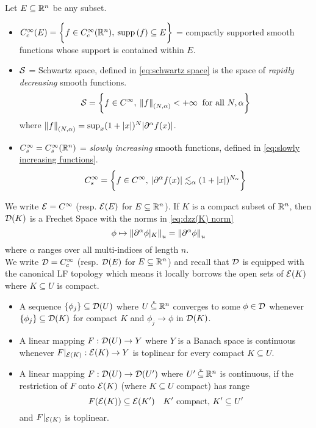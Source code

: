 \documentclass[../main-v2-manifolds.tex]{subfiles}
\begin{document}
Let $E\subseteq {\mathbb{R}^n}$ be any subset.
\begin{itemize}
    \item $C^\infty_c(E)=\biggl\{{f\in C_c^\infty({\mathbb{R}^n}),\: \operatorname{supp}{(f)}\subseteq E}\biggr\}$ = compactly supported smooth functions whose support is contained within $E$.
\end{itemize}
\begin{itemize}
    \item $\mathcal{S}$ = Schwartz space, defined in \cref{eq:schwartz space} is the space of \emph{rapidly decreasing} smooth functions.
        \begin{equation}
        \mathcal{S}=\biggl\{{f\in C^\infty,\: \norm{f}_{(N,\alpha)} <+\infty\:\text{ for all }N,\alpha}\biggr\}
        \label{eq:schwartz space}
    \end{equation}
    where $\norm{f}_{(N,\alpha)} = \sup_{x}(1+\vert {x} \vert)^{N}\vert {\partial^\alpha f(x)} \vert$.
    \item $C_s^\infty= C_s^\infty({\mathbb{R}^n})$ = \emph{slowly increasing} smooth functions, defined in \cref{eq:slowly increasing functions}.
        \begin{equation}\label{eq:slowly increasing functions}
        C_s^\infty = \biggl\{{f\in C^\infty,\: \vert {\partial^\alpha f(x)} \vert\lesssim_\alpha (1+\vert {x} \vert)^{N_{\alpha}}}\biggr\}
    \end{equation}
\end{itemize}

We write $\mathcal{E} = C^\infty$ (resp. $\mathcal{E}(E)$ for $E\subseteq{\mathbb{R}^n}$). If $K$ is a compact subset of ${\mathbb{R}^n}$, then $\mathcal{D}(K)$ is a Frechet Space with the norms in \cref{eq:dzz(K) norm}
\begin{equation}\label{eq:dzz(K) norm}
    \phi\mapsto \norm{\partial^\alpha\phi\vert_K}_u = \norm{\partial^\alpha\phi}_u
\end{equation}
where $\alpha$ ranges over all multi-indices of length $n$. \\

We write $\mathcal{D} = C^\infty_c$ (resp. $\mathcal{D}(E)$ for $E\subseteq{\mathbb{R}^n}$) and recall that $\mathcal{D}$ is equipped with the canonical LF topology which means it locally borrows the open sets of $\mathcal{E}(K)$ where $K\subseteq U$ is compact. 
\begin{itemize}
    \item A sequence $\{\phi_j\}\subseteq\mathcal{D}(U)$ where $U\:\mathring{\subseteq}\:{\mathbb{R}^n}$ converges to some $\phi\in \mathcal{D}$ whenever $\{\phi_j\}\subseteq \mathcal{D}(K)$ for compact $K$ and $\phi_j\to \phi$ in $\mathcal{D}(K)$.
    \item A linear mapping $F: \mathcal{D}(U)\to Y$ where $Y$ is a Banach space is continuous whenever $F\vert_{\mathcal{E}(K)}: \mathcal{E}(K)\to Y$ is toplinear for every compact $K\subseteq U$.
    \item A linear mapping $F:\mathcal{D}(U)\to \mathcal{D}(U')$ where $U'\:\mathring{\subseteq}\: {\mathbb{R}^n}$ is continuous, if the restriction of $F$ onto $\mathcal{E}(K)$ (where $K\subseteq U$ compact) has range 
    \[
        F(\mathcal{E}(K))\subseteq\mathcal{E}(K')\quad K'\text{ compact, } K'\subseteq U'
    \]
    and $F\vert_{\mathcal{E}(K)}$ is toplinear.
\end{itemize}
\end{document}
